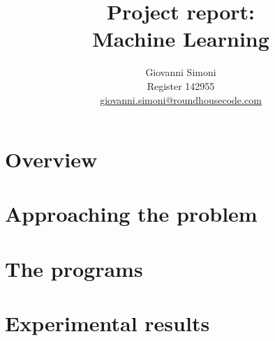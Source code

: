 \documentclass[10pt,a4paper]{article}
\title {
    Project report:\\
    Machine Learning
}
\author{
    Giovanni Simoni\\
    Register 142955\\
    \href{mailto:giovanni.simoni@roundhousecode.com}
         {giovanni.simoni@roundhousecode.com}
}
\begin{document}
    \maketitle

    \tableofcontents

    \newpage
    \section{ Overview } \label{sec:Overview}
    

    \section{ Approaching the problem } \label{sec:Approaching-the-problem}
    

    \section{ The programs } \label{sec:Programs}
    

    \section{ Experimental results } \label{sec:Experimental-results}
    
\end{document}
